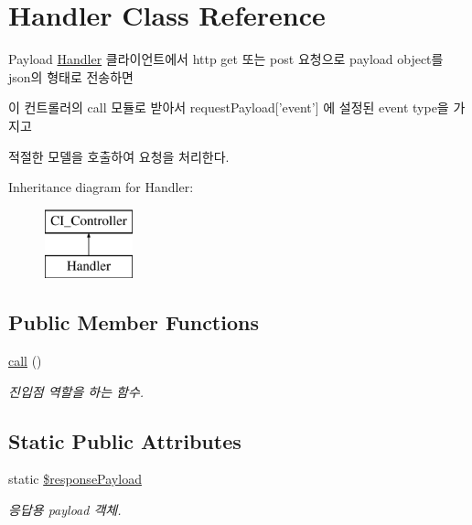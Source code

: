 \hypertarget{class_handler}{\section{Handler Class Reference}
\label{class_handler}
}


Payload \hyperlink{class_handler}{Handler} 클라이언트에서 http get 또는 post 요청으로 payload object를 json의 형태로 전송하면\par
 이 컨트롤러의 call 모듈로 받아서 request\-Payload\mbox{[}'event'\mbox{]} 에 설정된 event type을 가지고\par
 적절한 모델을 호출하여 요청을 처리한다.  


Inheritance diagram for Handler\-:\begin{figure}[H]
\begin{center}
\leavevmode
\includegraphics[height=2.000000cm]{class_handler}
\end{center}
\end{figure}
\subsection*{Public Member Functions}
\begin{DoxyCompactItemize}
\item 
\hyperlink{class_handler_a3abfc4c9e7b225e55352dbd29a658b69}{call} ()
\begin{DoxyCompactList}\small\item\em 진입점 역할을 하는 함수. \end{DoxyCompactList}\end{DoxyCompactItemize}
\subsection*{Static Public Attributes}
\begin{DoxyCompactItemize}
\item 
static \hyperlink{class_handler_a651840e3b5f431b660c11ebefceb1ae7}{\$response\-Payload}
\begin{DoxyCompactList}\small\item\em 응답용 payload 객체. \end{DoxyCompactList}\end{DoxyCompactItemize}
